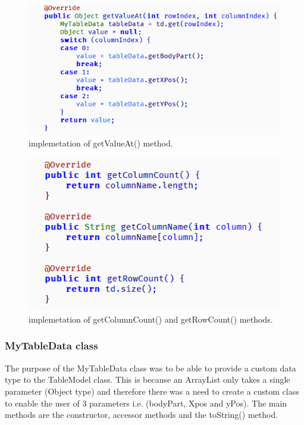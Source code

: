 \documentclass[a4paper, 12pt]{article}
\begin{document}
\begin{figure}[!htb]
	\begin{center}
  \includegraphics[scale=0.9]{codesnippet10.png}
  	\caption{implemetation of getValueAt() method.}
  \end{center} 
  \label{fig: codesnippet9} 
\end{figure}

\begin{figure}[!htb]
	\begin{center}
  \includegraphics[scale=0.75]{codesnippet9.png}
  	\caption{implemetation of getColumnCount() and getRowCount() methods.}
  \end{center} 
  \label{fig: codesnippet8} 
\end{figure}


\subsubsection{MyTableData class}

The purpose of the MyTableData class was to be able to provide a custom data type to the TableModel class. This is because an ArrayList only takes a single parameter (Object type) and therefore there was a need to create a custom class to enable the user of 3 parameters i.e. (bodyPart, Xpos and yPos). The main methods are the constructor, accessor methods and the toString() method. 
\end{document}
